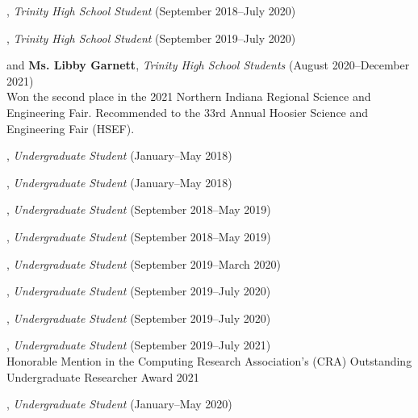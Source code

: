 \documentclass[10pt]{article}
\newenvironment{myindentpar}[1]%
{\begin{list}{}%
         {\setlength{\leftmargin}{#1}}%
         \item[]%
}
{\end{list}}
\newcounter{list}
\begin{document}
\begin{myindentpar}{0.75cm}

\hspace{-0.75cm}{\bf Eric Zhang}, \textit{Trinity High School Student} (September 2018--July 2020)

\hspace{-0.75cm}{\bf Michael Florin}, \textit{Trinity High School Student} (September 2019--July 2020)

\hspace{-0.75cm}{\bf Ms. Rebekah Fang} and {\bf Ms. Libby Garnett}, \textit{Trinity High School Students} (August 2020--December 2021) \\
	Won the second place in the 2021 Northern Indiana Regional Science and Engineering Fair. Recommended to the 33rd Annual Hoosier Science and Engineering Fair (HSEF).

\hspace{-0.75cm}{\bf Matthew Malir}, \textit{Undergraduate Student} (January--May 2018)
	
\hspace{-0.75cm}{\bf Sebastian Miner}, \textit{Undergraduate Student} (January--May 2018)

\hspace{-0.75cm}{\bf Matthew Schoenbauer}, \textit{Undergraduate Student} (September 2018--May 2019)
	
\hspace{-0.75cm}{\bf Ms. Yuhan (Tina) Wu}, \textit{Undergraduate Student} (September 2018--May 2019)

\hspace{-0.75cm}{\bf Chan Hee Song}, \textit{Undergraduate Student} (September 2019--March 2020)

\hspace{-0.75cm}{\bf Xiangyu Dong}, \textit{Undergraduate Student} (September 2019--July 2020)

\hspace{-0.75cm}{\bf Tianze Zheng}, \textit{Undergraduate Student} (September 2019--July 2020)

\hspace{-0.75cm}{\bf Bo Ni}, \textit{Undergraduate Student} (September 2019--July 2021) \\
	Honorable Mention in the Computing Research Association's (CRA) Outstanding Undergraduate Researcher Award 2021

\hspace{-0.75cm}{\bf Alvin Alaphat}, \textit{Undergraduate Student} (January--May 2020)


\end{myindentpar}
\end{document}
